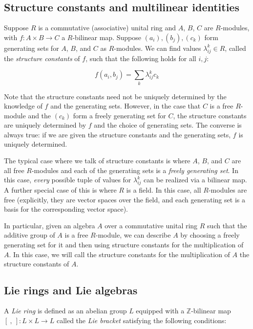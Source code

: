 \subsection{Structure constants and multilinear identities}

Suppose $R$ is a commutative (associative) unital ring and $A$, $B$,
$C$ are $R$-modules, with $f:A \times B \to C$ a $R$-bilinear
map. Suppose $(a_i), (b_j),(c_k)$ form generating sets for $A$, $B$,
and $C$ as $R$-modules. We can find values $\lambda_{ij}^k \in R$,
called the {\em structure constants} of $f$, such that the following
holds for all $i,j$:

$$f(a_i,b_j) = \sum_k \lambda_{ij}^k c_k$$

Note that the structure constants need not be uniquely determined by
the knowledge of $f$ and the generating sets. However, in the case
that $C$ is a free $R$-module and the $(c_k)$ form a freely generating
set for $C$, the structure constants are uniquely determined by $f$
and the choice of generating sets. The converse is always true: if we
are given the structure constants and the generating sets, $f$ is
uniquely determined.

The typical case where we talk of structure constants is where $A$,
$B$, and $C$ are all free $R$-modules and each of the generating sets
is a {\em freely generating set}. In this case, {\em every} possible
tuple of values for $\lambda_{ij}^k$ can be realized via a bilinear
map. A further special case of this is where $R$ is a field. In this
case, all $R$-modules are free (explicitly, they are vector spaces
over the field, and each generating set is a basis for the
corresponding vector space).

In particular, given an algebra $A$ over a commutative unital ring $R$
such that the additive group of $A$ is a free $R$-module, we can
describe $A$ by choosing a freely generating set for it and then using
structure constants for the multiplication of $A$. In this case, we
will call the structure constants for the multiplication of $A$ the
structure constants of $A$.

\subsection{Lie rings and Lie algebras}\label{appsec:Lie}
A {\em Lie ring} is defined as an abelian group $L$ equipped with a
$\mathbb{Z}$-bilinear map $[ \ , \ ]:L \times L \to L$ called the {\em
  Lie bracket} satisfying the following conditions:

